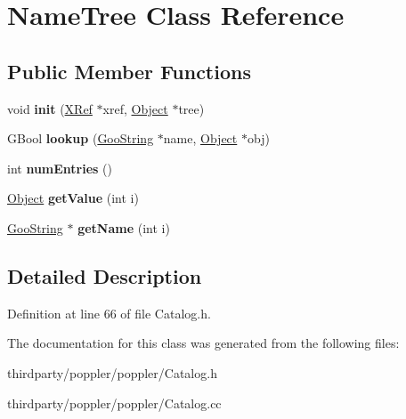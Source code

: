 \hypertarget{class_name_tree}{}\section{Name\+Tree Class Reference}
\label{class_name_tree}
\subsection*{Public Member Functions}
\begin{DoxyCompactItemize}
\item 
\mbox{\label{class_name_tree_a6b7ac9df466eb263e6987223791a2864}} 
void {\bfseries init} (\hyperlink{class_x_ref}{X\+Ref} $\ast$xref, \hyperlink{class_object}{Object} $\ast$tree)
\item 
\mbox{\label{class_name_tree_a84231b2a53185e6ccc46b1bdb0bea556}} 
G\+Bool {\bfseries lookup} (\hyperlink{class_goo_string}{Goo\+String} $\ast$name, \hyperlink{class_object}{Object} $\ast$obj)
\item 
\mbox{\label{class_name_tree_a453e40852c049b50a404d455662debb5}} 
int {\bfseries num\+Entries} ()
\item 
\mbox{\label{class_name_tree_a47af93afbad1887d98a751fc09edfb7c}} 
\hyperlink{class_object}{Object} {\bfseries get\+Value} (int i)
\item 
\mbox{\label{class_name_tree_a162bf67639816c1173922dc09e149ef9}} 
\hyperlink{class_goo_string}{Goo\+String} $\ast$ {\bfseries get\+Name} (int i)
\end{DoxyCompactItemize}


\subsection{Detailed Description}


Definition at line 66 of file Catalog.\+h.



The documentation for this class was generated from the following files\+:\begin{DoxyCompactItemize}
\item 
thirdparty/poppler/poppler/Catalog.\+h\item 
thirdparty/poppler/poppler/Catalog.\+cc\end{DoxyCompactItemize}
